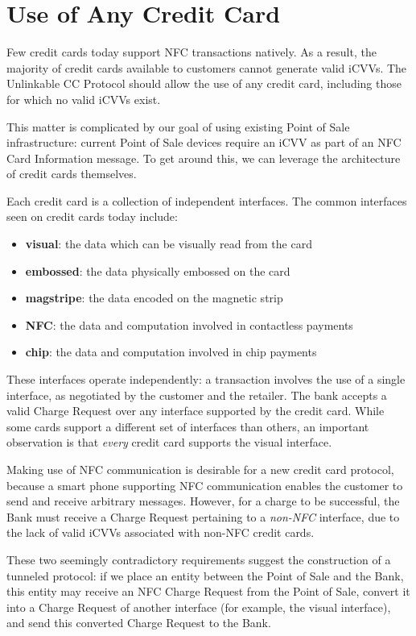 \section{Use of Any Credit Card}
\label{sec:goals-anycard}

Few credit cards today support NFC transactions natively.
As a result, the majority of credit cards available to customers cannot generate valid iCVVs.
The Unlinkable CC Protocol should allow the use of any credit card, including those for which no valid iCVVs exist.

This matter is complicated by our goal of using existing Point of Sale infrastructure:
    current Point of Sale devices require an iCVV as part of an NFC Card Information message.
To get around this, we can leverage the architecture of credit cards themselves.

Each credit card is a collection of independent interfaces.
The common interfaces seen on credit cards today include:

\begin{itemize}
\item \textbf{visual}: the data which can be visually read from the card
\item \textbf{embossed}: the data physically embossed on the card
\item \textbf{magstripe}: the data encoded on the magnetic strip
\item \textbf{NFC}: the data and computation involved in contactless payments
\item \textbf{chip}: the data and computation involved in chip payments
\end{itemize}

These interfaces operate independently:
    a transaction involves the use of a single interface, as negotiated by the customer and the retailer.
The bank accepts a valid Charge Request over any interface supported by the credit card.
While some cards support a different set of interfaces than others, an important observation is that \emph{every} credit card supports the visual interface.

Making use of NFC communication is desirable for a new credit card protocol,
    because a smart phone supporting NFC communication enables the customer to send and receive arbitrary messages.
However, for a charge to be successful, the Bank must receive a Charge Request pertaining to a \emph{non-NFC} interface,
    due to the lack of valid iCVVs associated with non-NFC credit cards.

These two seemingly contradictory requirements suggest the construction of a tunneled protocol:
    if we place an entity between the Point of Sale and the Bank, this entity may receive an NFC Charge Request from the Point of Sale,
    convert it into a Charge Request of another interface (for example, the visual interface),
    and send this converted Charge Request to the Bank.
